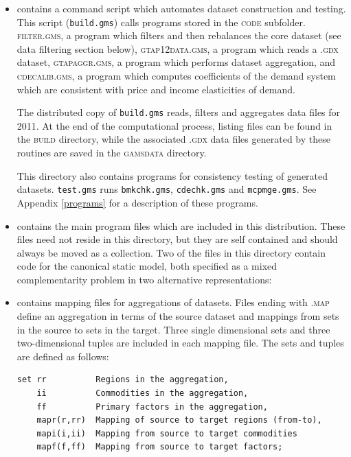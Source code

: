 \begin{itemize}

\item[\textsc{build}] contains a command script which automates
  dataset construction and testing. This script (\texttt{build.gms})
  calls programs stored in the \textsc{code}
  subfolder. \textsc{filter.gms}, a program which filters and then
  rebalances the core dataset (see data filtering section below),
  \textsc{gtap12data.gms}, a program which reads a \textsc{.gdx}
  \GTAPINGAMS dataset, \textsc{gtapaggr.gms}, a program which performs
  dataset aggregation, and \textsc{cdecalib.gms}, a program which
  computes coefficients of the \CDE demand system which are consistent
  with price and income elasticities of demand.

The distributed copy of \texttt{build.gms} reads, filters and
aggregates data files for 2011. At the end of the computational
process, listing files can be found in the
\textsc{build} directory, while the associated \textsc{.gdx} data files
generated by these routines are saved in the \textsc{gamsdata}
directory.

This directory also contains programs for consistency testing of
generated datasets. \texttt{test.gms} runs \texttt{bmkchk.gms},
\texttt{cdechk.gms} and \texttt{mcpmge.gms}. See Appendix
\ref{programs} for a description of these programs.

\item[\textsc{code}] contains the main \GAMS program files which are
included in this distribution. These files need not reside in this
directory, but they are self contained and should always be moved as a
collection. Two of the files in this directory contain \GAMS code for
the canonical static model, both specified as a mixed complementarity
problem in two alternative representations:


\item[\textsc{defines}] contains mapping files for aggregations of
 datasets. Files ending with \textsc{.map} define an
aggregation in terms of the source dataset and mappings from sets in
the source to sets in the target. Three single dimensional sets and
three two-dimensional tuples are included in each mapping file. The
sets and tuples are defined as follows:
\begin{Verbatim}
set rr          Regions in the aggregation,
    ii          Commodities in the aggregation,
    ff          Primary factors in the aggregation,
    mapr(r,rr)  Mapping of source to target regions (from-to),
    mapi(i,ii)  Mapping from source to target commodities
    mapf(f,ff)  Mapping from source to target factors;
\end{Verbatim}


\end{itemize}
